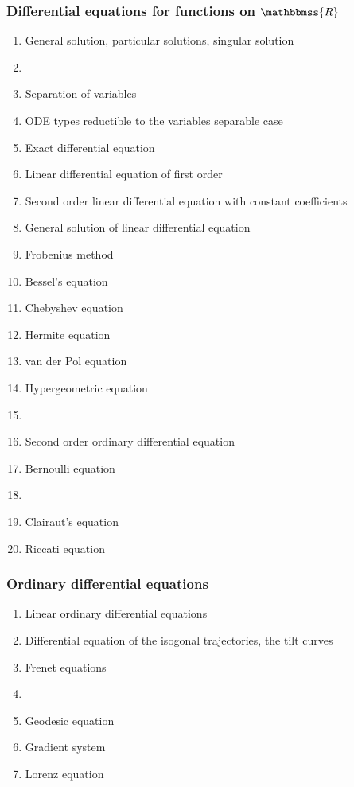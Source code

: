 \documentclass[12pt]{article}
\newcommand{\R}{\mathbbmss{R}}
\begin{document}
\subsubsection*{Differential equations for functions on $\R$ }
\begin{enumerate}
\item General solution, particular solutions, singular solution
\item {}
\item Separation of variables
\item ODE types reductible to the variables separable case
\item Exact differential equation
\item Linear differential equation of first order
\item Second order linear differential equation with constant coefficients
\item General solution of linear differential equation
\item Frobenius method
\item Bessel's equation
\item Chebyshev equation 
\item Hermite equation
\item van der Pol equation
\item Hypergeometric equation 
\item {}
\item Second order ordinary differential equation
\item Bernoulli equation
\item {}
\item Clairaut's equation
\item Riccati equation
\end{enumerate}

\subsubsection*{Ordinary differential equations}
\begin{enumerate}
\item Linear ordinary differential equations
\item Differential equation of the isogonal trajectories, the tilt curves
\item Frenet equations
\item {}
\item Geodesic equation
\item Gradient system
\item Lorenz equation 
\end{enumerate}
\end{document}
